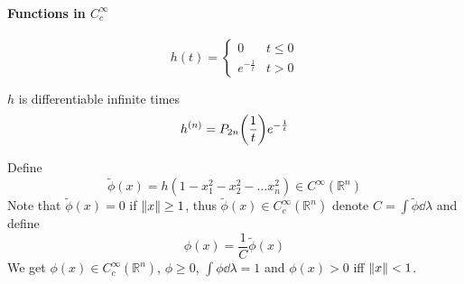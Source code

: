 \paragraph{Functions in $C^\infty_c$}
$$h(t) = \begin{cases}
0&t\leq 0\\
e^{-\frac{1}{t}}& t>0
\end{cases}$$

$h$ is differentiable infinite times
$$h^{(n)} = P_{2n} \qty(\frac{1}{t}) e^{-\frac{1}{t}}$$
	
Define
$$\tilde{\phi} (x) = h(1-x_1^2-x_2^2-\dots x_n^2) \in C^\infty(\mathbb{R}^n)$$
Note that $\tilde{\phi}(x) = 0$ if $\norm{x} \geq 1$, thus $\tilde{\phi}(x) \in C_c^\infty(\mathbb{R}^n)$ denote $C = \int \tilde{\phi} \dd{\lambda}$ and define
$$\phi(x) = \frac{1}{C} \tilde{\phi}(x)$$
We get $\phi(x) \in C_c^\infty(\mathbb{R}^n)$, $\phi\geq 0$, $\int \phi \dd{\lambda} = 1$ and $\phi(x)>0$ iff $\norm{x} <1$.